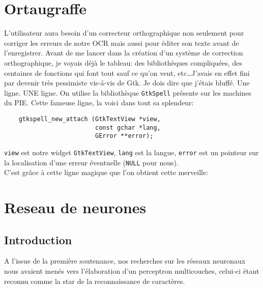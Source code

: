 \documentclass[a4paper,10pt]{report}
\begin{document}
	\section{Ortaugraffe} %
	\label{sec:ortaugraffe}
		L'utilisateur aura besoin d'un correcteur orthographique non seulement pour corriger les erreurs de notre OCR mais aussi pour \'editer son texte avant de l'enregistrer. Avant de me lancer dans la cr\'eation d'un syst\`eme de correction orthographique, je voyais d\'ej\`a le tableau: des biblioth\`eques compliqu\'ees, des centaines de fonctions qui font tout sauf ce qu'on veut, etc\ldots J'avais en effet fini par devenir tr\`es pessimiste vis-\'a-vis de Gtk. Je dois dire que j'\'etais bluff\'e. Une ligne. UNE ligne. On utilise la biblioth\`eque \verb!GtkSpell! pr\'esente sur les machines du PIE. Cette fameuse ligne, la voici dans tout sa splendeur:
		\begin{lstlisting}
    gtkspell_new_attach (GtkTextView *view,
                         const gchar *lang,
                         GError **error);
		\end{lstlisting}
		\verb!view! est notre widget \verb!GtkTextView!, \verb!lang! est la langue, \verb!error! est un pointeur sur la localisation d'une erreur \'eventuelle (\verb!NULL! pour nous).\\
		C'est gr\^ace \`a cette ligne magique que l'on obtient cette merveille:




\section{Reseau de neurones} %
\label{sec:reseau_de_neurones}

\subsection{Introduction} %
\label{subsec:introduction}
A l'issue de la premi\`ere soutenance, nos recherches sur les r\'eseaux
neuronaux nous avaient men\'es vers l'\'elaboration d'un perceptron
multicouches, celui-ci \'etant reconnu comme la star de la
reconnaissance de caract\`eres.
\end{document}
